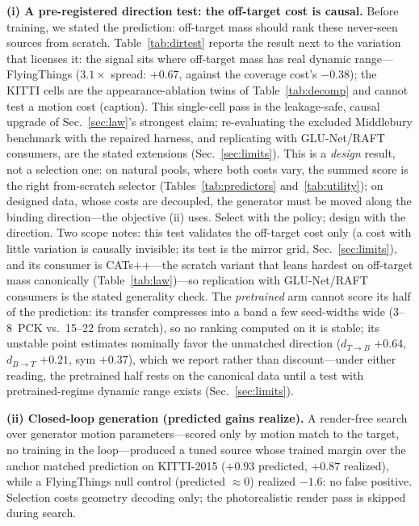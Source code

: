 \documentclass[runningheads]{llncs}
\newcommand{\dtb}{d_{T\to B}}
\newcommand{\dbt}{d_{B\to T}}
\newcommand{\pck}{PCK}
\begin{document}
\noindent\textbf{(i) A pre-registered direction test: the off-target cost
is causal.}
Before training, we stated the prediction: off-target mass should rank
these never-seen sources from scratch. Table~\ref{tab:dirtest} reports the
result next to the variation that licenses it: the signal sits where
off-target mass has real dynamic range---FlyingThings ($3.1\times$ spread:
$+0.67$, against the coverage cost's $-0.38$); the KITTI cells are the
appearance-ablation twins of Table~\ref{tab:decomp} and cannot test a
motion cost (caption). This single-cell pass is the leakage-safe, causal
upgrade of Sec.~\ref{sec:law}'s strongest claim; re-evaluating the excluded
Middlebury benchmark with the repaired harness, and replicating with
GLU-Net/RAFT consumers, are the stated extensions
(Sec.~\ref{sec:limits}). This is a \emph{design} result, not a selection
one: on natural pools, where both costs vary, the
summed score is the right from-scratch selector
(Tables~\ref{tab:predictors} and~\ref{tab:utility}); on designed data,
whose costs are decoupled, the generator must be moved along the binding
direction---the objective (ii) uses. Select with the policy; design with
the direction. Two scope notes: this test validates the off-target cost
only (a cost with little variation is causally invisible; its test is the
mirror grid, Sec.~\ref{sec:limits}), and its consumer is CATs++---the scratch
variant that leans hardest on off-target mass canonically
(Table~\ref{tab:law})---so replication with GLU-Net/RAFT consumers is the
stated generality check. The \emph{pretrained} arm cannot score its half of
the prediction: its transfer compresses into a band a few seed-widths wide
(3--8~\pck{} vs.\ 15--22 from scratch), so no ranking computed on it is
stable; its unstable point estimates nominally favor the unmatched
direction ($\dtb$ $+0.64$, $\dbt$ $+0.21$, sym $+0.37$), which we report
rather than discount---under either reading, the pretrained half rests on
the canonical data until a test with pretrained-regime dynamic range exists
(Sec.~\ref{sec:limits}).

\noindent\textbf{(ii) Closed-loop generation (predicted gains realize).}
A render-free search over generator motion parameters---scored only by
motion match to the target, no training in the loop---produced a tuned source
whose trained margin over the anchor matched prediction on KITTI-2015
($+0.93$ predicted, $+0.87$ realized), while a FlyingThings null control
(predicted ${\approx}0$) realized $-1.6$: no false positive. Selection costs
geometry decoding only; the photorealistic render pass is skipped during
search.
\end{document}
